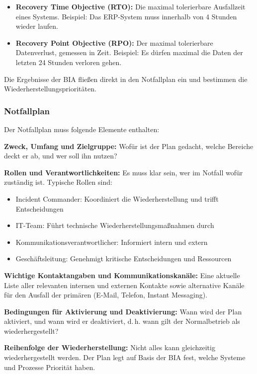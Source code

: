 \begin{itemize}
    \item \textbf{Recovery Time Objective (RTO):} Die maximal tolerierbare Ausfallzeit eines Systems. Beispiel: Das ERP-System muss innerhalb von 4 Stunden wieder laufen.
    \item \textbf{Recovery Point Objective (RPO):} Der maximal tolerierbare Datenverlust, gemessen in Zeit. Beispiel: Es dürfen maximal die Daten der letzten 24 Stunden verloren gehen.
\end{itemize}

Die Ergebnisse der BIA fließen direkt in den Notfallplan ein und bestimmen die Wiederherstellungsprioritäten.
\newpage
\subsubsection{Notfallplan}

Der Notfallplan muss folgende Elemente enthalten:

\textbf{Zweck, Umfang und Zielgruppe:} Wofür ist der Plan gedacht, welche Bereiche deckt er ab, und wer soll ihn nutzen?

\textbf{Rollen und Verantwortlichkeiten:} Es muss klar sein, wer im Notfall wofür zuständig ist. Typische Rollen sind:
\begin{itemize}
    \item Incident Commander: Koordiniert die Wiederherstellung und trifft Entscheidungen
    \item IT-Team: Führt technische Wiederherstellungsmaßnahmen durch
    \item Kommunikationsverantwortlicher: Informiert intern und extern
    \item Geschäftsleitung: Genehmigt kritische Entscheidungen und Ressourcen
\end{itemize}

\textbf{Wichtige Kontaktangaben und Kommunikationskanäle:} Eine aktuelle Liste aller relevanten internen und externen Kontakte sowie alternative Kanäle für den Ausfall der primären (E-Mail, Telefon, Instant Messaging).

\textbf{Bedingungen für Aktivierung und Deaktivierung:} Wann wird der Plan aktiviert, und wann wird er deaktiviert, d.\,h. wann gilt der Normalbetrieb als wiederhergestellt?

\textbf{Reihenfolge der Wiederherstellung:} Nicht alles kann gleichzeitig wiederhergestellt werden. Der Plan legt auf Basis der BIA fest, welche Systeme und Prozesse Priorität haben.

